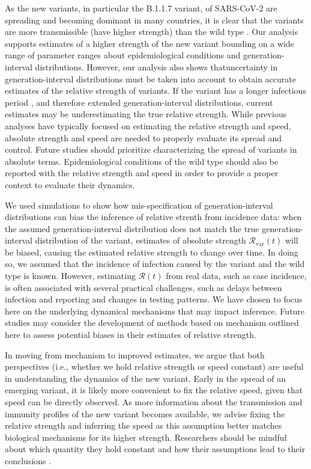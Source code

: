 \documentclass[12pt]{article}
\newcommand{\vvvar}{\mathrm{var}}
\newcommand{\Rx}[1]{\ensuremath{{\mathcal R}_{#1}}\xspace}
\newcommand{\RR}{\ensuremath{{\mathcal R}}\xspace}
\newcommand{\Rv}{\Rx{\vvvar}}
\begin{document}
As the new variants, in particular the B.1.1.7 variant, of SARS-CoV-2 are spreading and becoming dominant in many countries, it is clear that the variants are more transmissible (have higher strength) than the wild type \citep{switzerland2021variant, davies2021estimated, di2021impact, leung2021early, volz2021transmission,zhao2021}.
Our analysis supports estimates of a higher strength of the new variant bounding on a wide range of parameter ranges about epidemiological conditions and generation-interval distributions.
However, our analysis also shows thatuncertainty in generation-interval distributions must be taken into account to obtain accurate estimates of the relative strength of variants.
If the variant has a longer infectious period \citep{kissler2021densely}, and therefore extended generation-interval distributions, current estimates may be underestimating the true relative strength.
While previous analyses have typically focused on estimating the relative strength and speed, absolute strength and speed are needed to properly evaluate its spread and control.
Future studies should prioritize characterizing the spread of variants in absolute terms.
Epidemiological conditions of the wild type should also be reported with the relative strength and speed in order to provide a proper context to evaluate their dynamics.

We used simulations to show how mis-specification of generation-interval distributions can bias the inference of relative strenth from incidence data:
when the assumed generation-interval distribution does not match the true generation-interval distribution of the variant, estimates of absolute strength $\Rv(t)$ will be biased, causing the estimated relative strength to change over time.
In doing so, we assumed that the incidence of infection caused by the variant and the wild type is known.
However, estimating $\RR(t)$ from real data, such as case incidence, is often associated with several practical challenges, such as delays between infection and reporting and changes in testing patterns.
We have chosen to focus here on the underlying dynamical mechanisms that may impact inference.
Future studies may consider the development of methods based on mechanism outlined here to assess potential biases in their estimates of relative strength. 

In moving from mechanism to improved estimates, we argue that both perspectives (i.e., whether we hold relative strength or speed constant) are useful in understanding the dynamics of the new variant.
Early in the spread of an emerging variant, it is likely more convenient to fix the relative speed, given that speed can be directly observed.
As more information about the transmission and immunity profiles of the new variant becomes available, we advise fixing the relative strength and inferring the speed as this assumption better matches biological mechanisms for its higher strength.
Researchers should be mindful about which quantity they hold constant and how their assumptions lead to their conclusions \citep{doi:10.1098/rspb.2020.1556}.
\end{document}
